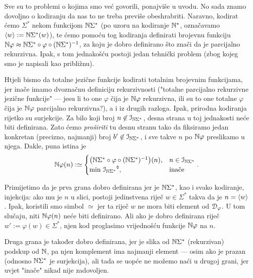 Sve su to problemi o kojima smo već govorili, ponajviše u uvodu. No sada znamo dovoljno o kodiranju da nas to ne treba previše obeshrabriti. Naravno, kodirat ćemo $\Sigma^*$ nekom funkcijom ${\mathbb N}\Sigma^*$ (po uzoru na kodiranje ${\mathbb N}^*$, označavamo $\langle w\rangle:={\mathbb N}\Sigma^*(w)$), te ćemo pomoću tog kodiranja definirati brojevnu funkciju ${\mathbb N}\varphi\approx{\mathbb N}\Sigma^*\circ\varphi\circ({\mathbb N}\Sigma^*)^{-1}$, za koju je dobro definirano što znači da je parcijalno rekurzivna. Ipak, s tom jednakošću postoji jedan tehnički problem (zbog kojeg smo je napisali kao približnu).

Htjeli bismo da totalne jezične funkcije kodirati totalnim brojevnim funkcijama, jer inače imamo dvoznačnu definiciju rekurzivnosti ("totalne parcijalno rekurzivne jezične funkcije" --- jesu li to one $\varphi$ čija je ${\mathbb N}\varphi$ rekurzivna, ili su to one totalne $\varphi$ čija je ${\mathbb N}\varphi$ parcijalno rekurzivna?), a i iz drugih razloga. Ipak, prirodna kodiranja rijetko su surjekcije. Za bilo koji broj $n\not\in\mathcal I_{{\mathbb N}\Sigma^*}$, desna strana u toj jednakosti neće biti definirana. Zato ćemo \emph{proširiti} tu desnu stranu tako da fiksiramo jedan konkretan (precizno, najmanji) broj $b'\not\in\mathcal I_{{\mathbb N}\Sigma^*}$, i sve takve $n$ po ${\mathbb N}\varphi$ preslikamo u njega. Dakle, puna istina je
\begin{equation}\label{eq:Nfidef}
    {\mathbb N}\varphi(n):\simeq\begin{cases}
    \bigl({\mathbb N}\Sigma^*\circ\varphi\circ({\mathbb N}\Sigma^*)^{-1}\bigr)(n),&n\in\mathcal I_{{\mathbb N}\Sigma^*}\\
    \min\,{\mathcal I_{{\mathbb N}\Sigma^*}}\sp{{\scriptscriptstyle\complement}},&\text{inače}
    \end{cases}\text.
\end{equation}

Primijetimo da je prva grana dobro definirana jer je ${\mathbb N}\Sigma^*$, kao i svako kodiranje, injekcija: ako mu je $n$ u slici, postoji jedinstvena riječ $w\in\Sigma^*$ takva da je $n=\langle w\rangle$. Ipak, koristili smo simbol $\simeq$ jer ta riječ $w$ ne mora biti element od $\mathcal D_{\varphi}$. U tom slučaju, niti ${\mathbb N}\varphi(n)$ neće biti definirano. Ali ako je dobro definirana riječ $w':=\varphi(w)\in\Sigma^*$, njen kod proglasimo vrijednošću funkcije ${\mathbb N}\varphi$ na $n$.

Druga grana je također dobro definirana, jer je slika od ${\mathbb N}\Sigma^*$ (rekurzivan) podskup od ${\mathbb N}$, pa njen komplement ima najmanji element --- osim ako je prazan (odnosno ${\mathbb N}\Sigma^*$ je surjekcija), ali tada se uopće ne možemo naći u drugoj grani, jer uvjet "inače" nikad nije zadovoljen.


